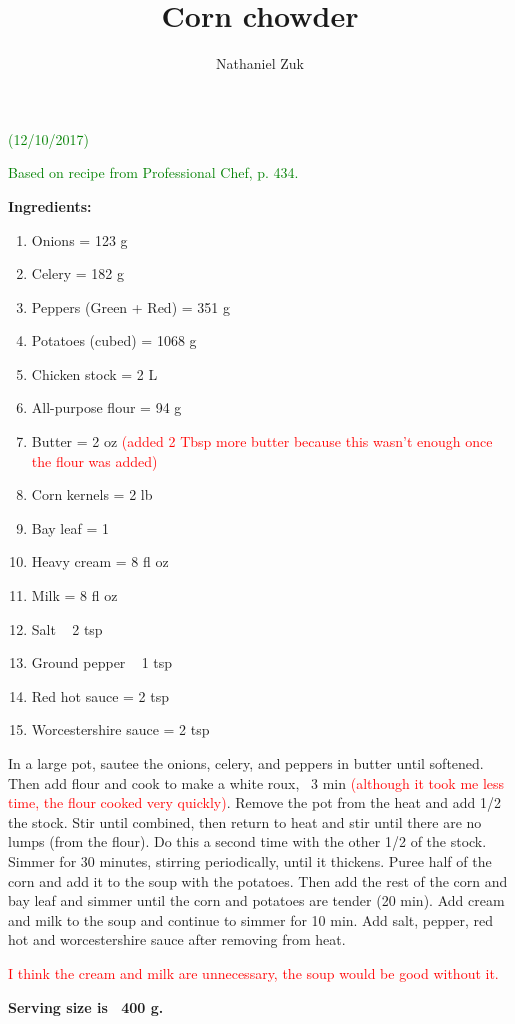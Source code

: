 \usepackage{parskip}
\usepackage{color}

\title{Corn chowder}
\author{Nathaniel Zuk}


\maketitle

\textcolor{green}{(12/10/2017)}

\textcolor{green}{Based on recipe from Professional Chef, p. 434.}

\textbf{Ingredients:}

\begin{enumerate}
\item Onions = 123 g
\item Celery = 182 g
\item Peppers (Green + Red) = 351 g
\item Potatoes (cubed) = 1068 g
\item Chicken stock = 2 L
\item All-purpose flour = 94 g
\item Butter = 2 oz \textcolor{red}{(added 2 Tbsp more butter because this wasn't enough once the flour was added)}
\item Corn kernels = 2 lb
\item Bay leaf = 1
\item Heavy cream = 8 fl oz
\item Milk = 8 fl oz
\item Salt ~ 2 tsp
\item Ground pepper ~ 1 tsp
\item Red hot sauce = 2 tsp
\item Worcestershire sauce = 2 tsp
\end{enumerate}

In a large pot, sautee the onions, celery, and peppers in butter until softened.  Then add flour and cook to make a white roux, ~3 min \textcolor{red}{(although it took me less time, the flour cooked very quickly)}.  Remove the pot from the heat and add 1/2 the stock.  Stir until combined, then return to heat and stir until there are no lumps (from the flour).  Do this a second time with the other 1/2 of the stock.  Simmer for 30 minutes, stirring periodically, until it thickens.  Puree half of the corn and add it to the soup with the potatoes.  Then add the rest of the corn and bay leaf and simmer until the corn and potatoes are tender (20 min).  Add cream and milk to the soup and continue to simmer for 10 min.  Add salt, pepper, red hot and worcestershire sauce after removing from heat.

\textcolor{red}{I think the cream and milk are unnecessary, the soup would be good without it.}

\textbf{Serving size is ~400 g.}

